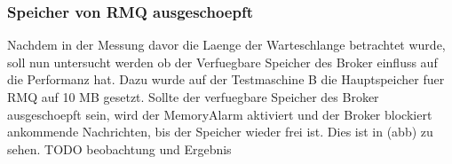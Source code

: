 

\subsubsection{Speicher von RMQ ausgeschoepft}
Nachdem in der Messung davor die Laenge der Warteschlange betrachtet wurde, soll nun untersucht werden ob der Verfuegbare Speicher des Broker einfluss auf die Performanz hat. Dazu wurde auf der Testmaschine B die Hauptspeicher fuer RMQ auf 10 MB gesetzt.  
Sollte der verfuegbare Speicher des Broker ausgeschoepft sein, wird der MemoryAlarm aktiviert und der Broker blockiert ankommende Nachrichten, bis der Speicher wieder frei ist. Dies ist in (abb) zu sehen.
TODO beobachtung und Ergebnis

